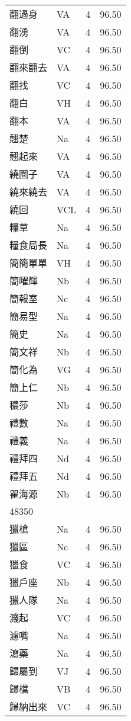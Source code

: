 \documentclass[twocolumn]{book}
\begin{document}
\begin{supertabular}{llrr}
翻過身 & VA & 4 &  96.50\\
翻湧 & VA & 4 &  96.50\\
翻倒 & VC & 4 &  96.50\\
翻來翻去 & VA & 4 &  96.50\\
翻找 & VC & 4 &  96.50\\
翻白 & VH & 4 &  96.50\\
翻本 & VA & 4 &  96.50\\
翹楚 & Na & 4 &  96.50\\
翹起來 & VA & 4 &  96.50\\
繞圈子 & VA & 4 &  96.50\\
繞來繞去 & VA & 4 &  96.50\\
繞回 & VCL & 4 &  96.50\\
糧草 & Na & 4 &  96.50\\
糧食局長 & Na & 4 &  96.50\\
簡簡單單 & VH & 4 &  96.50\\
簡曜輝 & Nb & 4 &  96.50\\
簡報室 & Nc & 4 &  96.50\\
簡易型 & Na & 4 &  96.50\\
簡史 & Na & 4 &  96.50\\
簡文祥 & Nb & 4 &  96.50\\
簡化為 & VG & 4 &  96.50\\
簡上仁 & Nb & 4 &  96.50\\
穠莎 & Nb & 4 &  96.50\\
禮數 & Na & 4 &  96.50\\
禮義 & Na & 4 &  96.50\\
禮拜四 & Nd & 4 &  96.50\\
禮拜五 & Nd & 4 &  96.50\\
瞿海源 & Nb & 4 &  96.50\\
48350\\
獵槍 & Na & 4 &  96.50\\
獵區 & Nc & 4 &  96.50\\
獵食 & VC & 4 &  96.50\\
獵戶座 & Nb & 4 &  96.50\\
獵人隊 & Na & 4 &  96.50\\
濺起 & VC & 4 &  96.50\\
濾嘴 & Na & 4 &  96.50\\
瀉藥 & Na & 4 &  96.50\\
歸屬到 & VJ & 4 &  96.50\\
歸檔 & VB & 4 &  96.50\\
歸納出來 & VC & 4 &  96.50\\

\end{supertabular}
\end{document}
